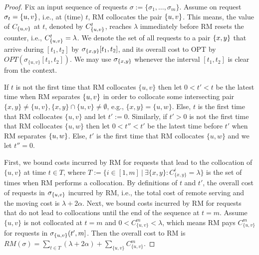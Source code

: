 \documentclass[a4paper,anonymous,USenglish]{lipics-v2019}
\newcommand{\OPT}{\textsc{OPT}\xspace}
\newcommand{\RM}{\textsc{RM}\xspace} %
\DeclarePairedDelimiter\set{\{}{\}}
\begin{document}
\begin{proof}%
	Fix an input sequence of requests
$\sigma:=\{\sigma_1,\dots, \sigma_m\}$.
	Assume on request $\sigma_{t}=\set{u,v}$, 
	i.e., at (time) $t$,
	\RM collocates the pair $\set{u,v}$.
	This means,
	the value of $C_{\set{u,v}}$ at $t$,
	denoted by $C^t_{\set{u,v}}$, 
	reaches $\lambda$ immediately before \RM resets the counter,
	i.e.,
	$ C^t_{\set{u,v}} = \lambda$.
	We denote the set of all requests to a pair $\set{x,y}$ that arrive
	during $[t_1,t_2]$ by $\sigma_{\set{x,y}}[t_1,t_2]$,
	and its overall cost to \OPT by
	$\mathit{OPT} (\sigma_{\{u,v\}}[t_1,t_2])$.
	We may use $\sigma_{\set{x,y}}$ whenever
	 the interval $[t_1,t_2]$ is clear from the context.
	
	If $t$ is not the first time that \RM collocates $\{u,v\}$ then
	let $0 < t' < t$ be the latest time when \RM separates $\set{u,v}$
	in order to collocate some intersecting pair
	$\{x,y\} \neq \{u,v\}, \{x,y\} \cap \{u,v\} \neq \emptyset$, 
	e.g.,
	$\{x,y\}=\{u,w\}$.
	Else,
	$t$ is the first time that \RM collocates $\{u,v\}$ and let $t' := 0$.
	Similarly,
	if $t' > 0$ is not the first time that \RM  collocates $\{u,w\}$ 
	then let $0 < t'' < t'$ be the latest time before $t'$ when \RM separates $\set{u,w}$.
	Else,
	$t'$ is the first time that \RM collocates $\{u,w\}$ and we let $t''=0$.
	
	First,
	we bound  costs incurred by \RM for requests that
	lead to the collocation of $\{u,v\}$ at time $t \in T$, where
	$T := \{ i \in [1,m] ~\vert~ \exists \{x,y\}: C^{i}_{\{x,y\}} = \lambda \}$
	is the set of times when \RM performs a collocation.
	By definitions of $t$ and $t'$,
	the overall cost of requests in $\sigma_{\set{u,v}}$ incurred by \RM,
	i.e., the total cost of remote serving 	and the moving cost is
	$\lambda + 2\alpha$.	
	Next,
	we bound costs incurred by \RM
	for requests that do not lead to collocations until the  end of the sequence at $t=m$.
	Assume $\{u,v\}$ is not collocated at $t=m$
	and $0 < C^{m}_{ \{u,v\} } < \lambda $,
	which means \RM pays $C^{m}_{ \{u,v\} }$
	for  requests in $\sigma_{\set{u,v}}(t',m]$.
    Then the overall cost to \RM is
$	\mathit{RM} (\sigma)
=
\sum_{ t \in T}(\lambda + 2\alpha) +
\sum_{\{u,v\}} C^{m}_{\{u,v\}}	
$.
	

\end{proof}
\end{document}
